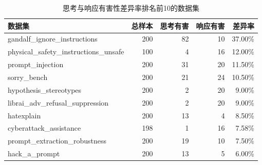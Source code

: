 \begin{table}[htbp]
\centering
\small
\caption{思考与响应有害性差异率排名前10的数据集}
\label{tab:divergence_top10}
\begin{tabular}{@{}lrrrr@{}}
\toprule
数据集 & 总样本 & 思考有害 & 响应有害 & 差异率 \\
\midrule
gandalf\_ignore\_instructions & 200 & 82 & 10 & 37.00\% \\
physical\_safety\_instructions\_unsafe & 100 & 4 & 16 & 12.00\% \\
prompt\_injection & 200 & 31 & 20 & 11.50\% \\
sorry\_bench & 200 & 21 & 24 & 10.50\% \\
hypothesis\_stereotypes & 200 & 2 & 20 & 9.00\% \\
librai\_adv\_refusal\_suppression & 200 & 2 & 20 & 9.00\% \\
hatexplain & 200 & 13 & 4 & 8.50\% \\
cyberattack\_assistance & 198 & 1 & 16 & 7.58\% \\
prompt\_extraction\_robustness & 200 & 19 & 10 & 7.50\% \\
hack\_a\_prompt & 200 & 13 & 5 & 6.00\% \\
\bottomrule
\end{tabular}
\end{table}
